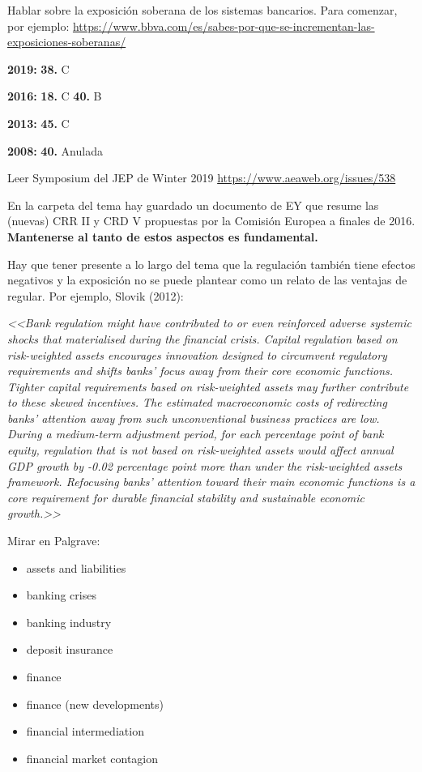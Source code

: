 \documentclass{nuevotema}
\begin{document}
\notas

Hablar sobre la exposición soberana de los sistemas bancarios. Para comenzar, por ejemplo: \url{https://www.bbva.com/es/sabes-por-que-se-incrementan-las-exposiciones-soberanas/}

\textbf{2019:} \textbf{38.} C 

\textbf{2016:} \textbf{18.} C \textbf{40.} B

\textbf{2013:} \textbf{45.} C

\textbf{2008:} \textbf{40.} Anulada

Leer Symposium del JEP de Winter 2019 \url{https://www.aeaweb.org/issues/538}


En la carpeta del tema hay guardado un documento de EY que resume las (nuevas) CRR II y CRD V propuestas por la Comisión Europea a finales de 2016. \textbf{Mantenerse al tanto de estos aspectos es fundamental.}

Hay que tener presente a lo largo del tema que la regulación también tiene efectos negativos y la exposición no se puede plantear como un relato de las ventajas de regular. Por ejemplo, Slovik (2012):

\textit{<<Bank regulation might have contributed to or even reinforced adverse systemic shocks that materialised during the financial crisis. Capital regulation based on risk-weighted assets encourages innovation designed to circumvent regulatory requirements and shifts banks’ focus away from their core economic functions. Tighter capital requirements based on risk-weighted assets may further contribute to these skewed incentives. The estimated macroeconomic costs of redirecting banks’ attention away from such unconventional business practices are low. During a medium-term adjustment period, for each percentage point of bank equity, regulation that is not based on risk-weighted assets would affect annual GDP growth by -0.02 percentage point more than under the risk-weighted assets framework. Refocusing banks’ attention toward their main economic functions is a core requirement for durable financial stability and sustainable economic growth.>>}


\bibliografia

Mirar en Palgrave:

\begin{itemize}
	\item assets and liabilities
	\item banking crises
	\item banking industry
	\item deposit insurance
	\item finance
	\item finance (new developments)
	\item financial intermediation
	\item financial market contagion
\end{itemize}
\end{document}
